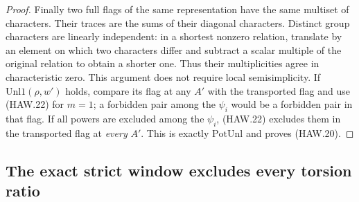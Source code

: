 \documentclass[11pt,a4paper]{article}
\numberwithin{equation}{section}
\theoremstyle{remark}\newtheorem{remark}[theorem]{Remark}
\begin{document}
\begin{proof}
Finally two full flags of the same representation have the
same multiset of characters.  Their traces are the sums of
their diagonal characters.  Distinct group characters are
linearly independent: in a shortest nonzero relation,
translate by an element on which two characters differ and
subtract a scalar multiple of the original relation to
obtain a shorter one.  Thus their multiplicities agree in
characteristic zero.  This argument does not require local
semisimplicity.  If $\mathrm{Unl1}(\rho,w')$ holds, compare
its flag at any $A'$ with the transported flag and use
(HAW.22) for $m=1$; a forbidden pair among the $\psi_i$
would be a forbidden pair in that flag.  If all powers are
excluded among the $\psi_i$, (HAW.22) excludes them in the
transported flag at \emph{every} $A'$.  This is exactly
$\mathrm{PotUnl}$ and proves (HAW.20).
\end{proof}

\subsection{The exact strict window excludes every torsion ratio}

\end{document}
